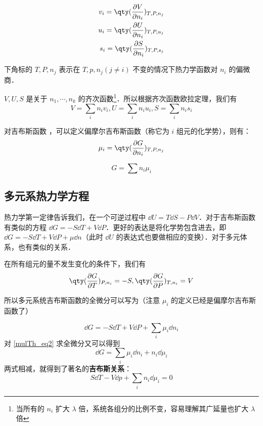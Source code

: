 \begin{equation}
\begin{aligned}
v_i=\qty(\frac{\partial V}{\partial n_i})_{T,P,n_j}\\
u_i=\qty(\frac{\partial U}{\partial n_i})_{T,P,u_j}\\
s_i=\qty(\frac{\partial S}{\partial n_i})_{T,P,s_j}
\end{aligned}
\end{equation}

下角标的 $T,P,n_j$ 表示在 $T,p,n_j(j\neq i)$ 不变的情况下热力学函数对 $n_i$ 的偏微商．

$V,U,S$ 是关于 $n_1,\cdots,n_k$ 的齐次函数\footnote{当所有的 $n_i$ 扩大 $\lambda$ 倍，系统各组分的比例不变，容易理解其广延量也扩大 $\lambda$ 倍}．所以根据齐次函数欧拉定理，我们有
\begin{equation}
V=\sum_i n_iv_i,U=\sum_i n_iu_i,S=\sum_i n_is_i
\end{equation}

对吉布斯函数 ，可以定义偏摩尔吉布斯函数（称它为 $i$ 组元的化学势），则有：
\begin{equation}
\mu_i=\qty(\frac{\partial G}{\partial n_i})_{T,P,n_j}
\end{equation}

\begin{equation}\label{mulTh_eq2}
G=\sum n_i \mu_i
\end{equation}

\subsection{多元系热力学方程}
热力学第一定律告诉我们，在一个可逆过程中 $\dd U=T\dd S-P\dd V$．对于吉布斯函数有类似的方程 $\dd G=-S\dd T+V\dd P$．更好的表达是将化学势包含进去，即 $\dd G=-S\dd T+V\dd P+\mu\dd n$（此时 $\dd U$ 的表达式也要做相应的变换）．对于多元体系，也有类似的关系．

在所有组元的量不发生变化的条件下，我们有
\begin{equation}
\qty(\frac{\partial G}{\partial T})_{P,n_i}=-S,\qty(\frac{\partial G}{\partial P})_{T,n_i}=V
\end{equation}

所以多元系统吉布斯函数的全微分可以写为（注意 $\mu_i$ 的定义已经是偏摩尔吉布斯函数了）

\begin{equation}
\dd G=-S\dd T+V\dd P+\sum_i\mu_i\dd n_i
\end{equation}
对 \autoref{mulTh_eq2} 求全微分又可以得到
\begin{equation}
\dd G=\sum_i\mu_i\dd n_i+n_i\dd \mu_i
\end{equation}
两式相减，就得到了著名的\textbf{吉布斯关系}：
\begin{equation}
S\dd T-V\dd p+\sum_i n_i\dd \mu_i=0
\end{equation}
